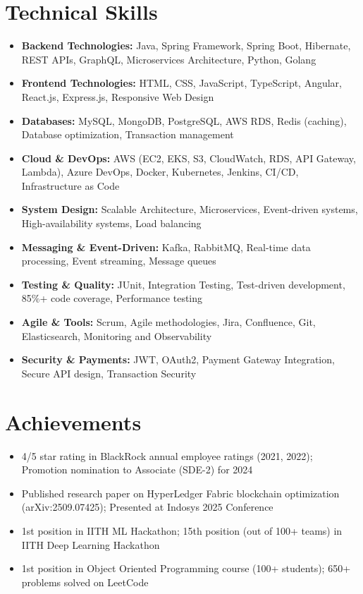 \documentclass[11pt,a4paper]{article}
\newcommand{\resumeItem}[1]{\item\small{#1}}
\begin{document}
\section{Technical Skills}
\begin{itemize}[leftmargin=*,noitemsep,topsep=0pt]
    \resumeItem{\textbf{Backend Technologies:} Java, Spring Framework, Spring Boot, Hibernate, REST APIs, GraphQL, Microservices Architecture, Python, Golang}
    \resumeItem{\textbf{Frontend Technologies:} HTML, CSS, JavaScript, TypeScript, Angular, React.js, Express.js, Responsive Web Design}
    \resumeItem{\textbf{Databases:} MySQL, MongoDB, PostgreSQL, AWS RDS, Redis (caching), Database optimization, Transaction management}
    \resumeItem{\textbf{Cloud \& DevOps:} AWS (EC2, EKS, S3, CloudWatch, RDS, API Gateway, Lambda), Azure DevOps, Docker, Kubernetes, Jenkins, CI/CD, Infrastructure as Code}
    \resumeItem{\textbf{System Design:} Scalable Architecture, Microservices, Event-driven systems, High-availability systems, Load balancing}
    \resumeItem{\textbf{Messaging \& Event-Driven:} Kafka, RabbitMQ, Real-time data processing, Event streaming, Message queues}
    \resumeItem{\textbf{Testing \& Quality:} JUnit, Integration Testing, Test-driven development, 85\%+ code coverage, Performance testing}
    \resumeItem{\textbf{Agile \& Tools:} Scrum, Agile methodologies, Jira, Confluence, Git, Elasticsearch, Monitoring and Observability}
    \resumeItem{\textbf{Security \& Payments:} JWT, OAuth2, Payment Gateway Integration, Secure API design, Transaction Security}
\end{itemize}

\section{Achievements}
\begin{itemize}[leftmargin=*,noitemsep,topsep=0pt]
    \resumeItem{4/5 star rating in BlackRock annual employee ratings (2021, 2022); Promotion nomination to Associate (SDE-2) for 2024}
    \resumeItem{Published research paper on HyperLedger Fabric blockchain optimization (arXiv:2509.07425); Presented at Indosys 2025 Conference}
    \resumeItem{1st position in IITH ML Hackathon; 15th position (out of 100+ teams) in IITH Deep Learning Hackathon}
    \resumeItem{1st position in Object Oriented Programming course (100+ students); 650+ problems solved on LeetCode}
\end{itemize}
\end{document}
